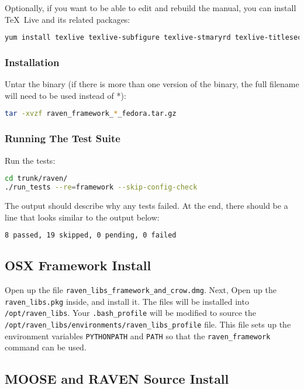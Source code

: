 Optionally, if you want to be able to edit and rebuild the manual, you can 
install \TeX~Live and its related packages:
\begin{lstlisting}[language=bash]
yum install texlive texlive-subfigure texlive-stmaryrd texlive-titlesec texlive-preprint
\end{lstlisting}

\subsubsection{Installation}
Untar the binary (if there is more than one version of the
binary, the full filename will need to be used instead of *):

\begin{lstlisting}[language=bash]
tar -xvzf raven_framework_*_fedora.tar.gz
\end{lstlisting}

\subsubsection{Running The Test Suite}
Run the tests:

\begin{lstlisting}[language=bash]
cd trunk/raven/
./run_tests --re=framework --skip-config-check
\end{lstlisting}

The output should describe why any tests failed.
%
At the end, there should be a line that looks similar to the output below:
\begin{lstlisting}[language=bash]
8 passed, 19 skipped, 0 pending, 0 failed
\end{lstlisting}

\subsection{OSX Framework Install}

Open up the file \texttt{raven\_libs\_framework\_and\_crow.dmg}.
%
Next, Open up the \texttt{raven\_libs.pkg} inside, and install it.
%
The files will be installed into \texttt{/opt/raven\_libs}.
%
Your \texttt{.bash\_profile} will be modified to source the
\texttt{/opt/raven\_libs/environments/raven\_libs\_profile} file.
%
This file sets up the environment variables \texttt{PYTHONPATH} and
\texttt{PATH} so that the \texttt{raven\_framework} command can be used.

\subsection{MOOSE and RAVEN Source Install}

